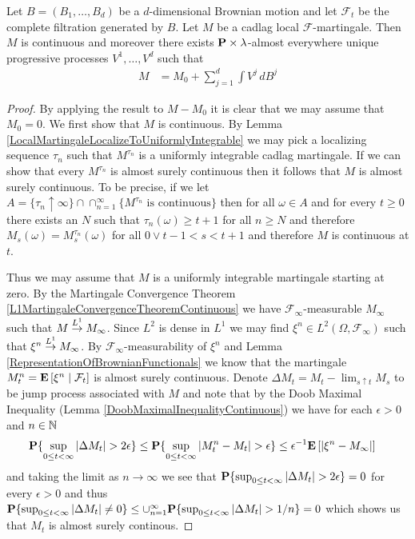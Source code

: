 \begin{thm}\label{MartingaleRepresentationTheorem}Let $B=(B_1, \dotsc, B_d)$ be a $d$-dimensional Brownian motion and let $\mathcal{F}_t$ be the complete filtration generated by $B$.  Let $M$ be a cadlag local $\mathcal{F}$-martingale.  Then $M$ is continuous and moreover there exists $\probabilityop \times \lambda$-almost everywhere unique progressive processes $V^1, \dotsc , V^d$ such that 
\begin{align*}
M &= M_0 + \sum_{j=1}^d \int V^j \, dB^j
\end{align*}
\end{thm}
\begin{proof}
By applying the result to $M-M_0$ it is clear that we may assume that $M_0=0$.  We first show that $M$ is continuous.  By Lemma \ref{LocalMartingaleLocalizeToUniformlyIntegrable} we may pick a localizing sequence $\tau_n$ such that $M^{\tau_n}$ is a uniformly integrable cadlag martingale.  If we can show that every $M^{\tau_n}$ is almost surely continuous then it follows that $M$ is almost surely continuous.  To be precise, if we let $A = \lbrace \tau_n \uparrow \infty \rbrace \cap \cap_{n=1}^\infty \lbrace M^{\tau_n} \text{ is continuous}\rbrace$ then for all $\omega \in A$ and for every $t \geq 0$ there exists an $N$ such that $\tau_n(\omega) \geq t+1$ for all $n \geq N$ and therefore $M_s(\omega) = M^{\tau_n}_s(\omega)$ for all $0 \vee t-1 < s < t+1$ and therefore $M$ is continuous at $t$. 

Thus we may assume that $M$ is a uniformly integrable martingale starting at zero.  By the Martingale Convergence Theorem \ref{L1MartingaleConvergenceTheoremContinuous} we have $\mathcal{F}_\infty$-measurable $M_\infty$ such that $M \tolp{1} M_\infty$.  Since $L^2$ is dense in $L^1$ we may find $\xi^n \in L^2(\Omega, \mathcal{F}_\infty)$ such that $\xi^n \tolp{1} M_\infty$.  By $\mathcal{F}_\infty$-measurability of $\xi^n$ and Lemma \ref{RepresentationOfBrownianFunctionals} we know that the martingale $M^n_t = \cexpectationlong{\mathcal{F}_t}{\xi^n}$ is almost surely continuous.  Denote $\Delta M_t = M_t - \lim_{s \uparrow t}M_s$ to be jump process associated with $M$ and note that by the Doob Maximal Inequality (Lemma \ref{DoobMaximalInequalityContinuous}) we have for each $\epsilon > 0$ and $n \in \naturals$
\begin{align*}
\probability{ \sup_{0 \leq t < \infty} \abs{\Delta M_t} > 2 \epsilon} &\leq \probability{\sup_{0 \leq t < \infty} \abs{M^n_t - M_t} > \epsilon} \leq \epsilon^{-1} \expectation{\abs{\xi^n - M_\infty}}
\end{align*}
and taking the limit as $n \to \infty$ we see that $\probability{ \sup_{0 \leq t < \infty} \abs{\Delta M_t} > 2 \epsilon} = 0$ for every $\epsilon > 0$ and thus $\probability{ \sup_{0 \leq t < \infty} \abs{\Delta M_t} \neq 0} \leq \cup_{n=1}^\infty \probability{ \sup_{0 \leq t < \infty} \abs{\Delta M_t} > 1/n} = 0$ which shows us that $M_t$ is almost surely continous.


\end{proof}
